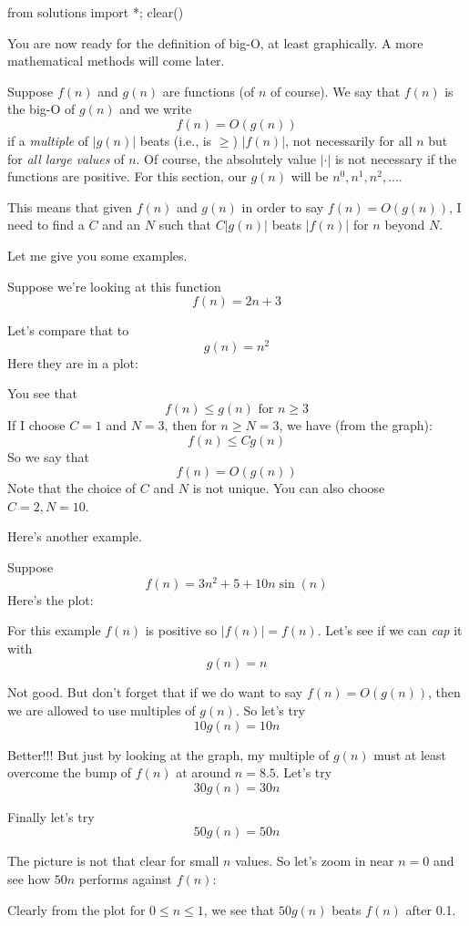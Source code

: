 \begin{python0}
from solutions import *; clear()
\end{python0}

You are now ready for the definition of big-O, at least graphically.
A more mathematical methods will come later.

Suppose $f(n)$ and $g(n)$ are functions (of $n$ of course).
We say that $f(n)$ is the big-O of $g(n)$ and we
write 
\[
f(n) = O(g(n))
\]
if a \textit{multiple} of $|g(n)|$ beats (i.e., is $\geq$) $|f(n)|$,
not necessarily for all $n$
but for \textit{all large values} of $n$.
Of course,
the absolutely value $| \cdot |$ is not necessary if the functions are
positive. 
For this section, our $g(n)$ will be $n^0, n^1, n^2, ...$.

This means that given $f(n)$ and $g(n)$ 
in order to say $f(n) = O(g(n))$, I need to find a $C$ and an $N$ such that
$C|g(n)|$ beats $|f(n)|$ for $n$ beyond $N$.

Let me give you some examples.

Suppose we're looking at this function
\[
f(n) = 2n + 3
\]

Let's compare that to
\[
g(n) = n^2
\]
Here they are in a plot:

You see that 
\[
f(n) \leq g(n) \text{ for $n \geq 3$}
\]
If I choose $C = 1$ and $N = 3$, then for $n \geq N = 3$, 
we have (from the graph):
\[
f(n) \leq Cg(n)
\]
So we say that 
\[
f(n) = O(g(n))
\]
Note that the choice of $C$ and $N$ is not unique.
You can also choose $C = 2, N = 10$.

Here's another example.

Suppose
\[
f(n) = 3n^2 + 5 + 10 n \sin (n)
\]
Here's the plot:

For this example $f(n)$ is positive so $|f(n)| = f(n)$.
Let's see if we can \textit{cap} it with 
\[
g(n) = n
\]

Not good.
But don't forget that if we do want to say $f(n) = O(g(n))$,
then we are allowed to use multiples of $g(n)$.
So let's try
\[
10g(n) = 10 n
\]


Better!!!
But just by looking at the graph,
my multiple of $g(n)$ must at least 
overcome the bump of $f(n)$ at around $n=8.5$.
Let's try 
\[
30g(n) = 30 n
\]


Finally let's try
\[
50g(n) = 50n
\]


The picture is not that clear for small $n$ values.
So let's zoom in near $n = 0$ and see how $50n$ performs
against $f(n)$:

Clearly from the plot for $0 \leq n \leq 1$, we see that
$50g(n)$ beats $f(n)$ after 0.1.

